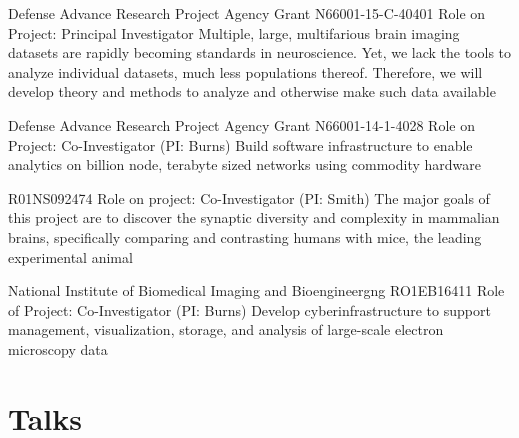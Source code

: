\documentclass[10pt,colorlinks=true,urlcolor=blue]{moderncv}
\begin{document}
{\newline Defense Advance Research Project Agency Grant N66001-15-C-40401
\newline Role on Project: Principal Investigator
\newline Multiple, large, multifarious brain imaging datasets are rapidly becoming standards in
neuroscience. Yet, we lack the tools to analyze individual datasets, much less
populations thereof. Therefore, we will develop theory and methods to analyze and
otherwise make such data available}{}{}{}{}

{\newline Defense Advance Research Project Agency Grant N66001-14-1-4028
\newline Role on Project: Co-Investigator (PI: Burns)
\newline Build software infrastructure to enable analytics on billion node, terabyte sized networks
using commodity hardware}{}{}{}{}

{\newline R01NS092474
\newline Role on project: Co-Investigator (PI: Smith)
\newline The major goals of this project are to discover the synaptic diversity and complexity in
mammalian brains, specifically comparing and contrasting humans with mice, the leading
experimental animal}{}{}{}{}

{\newline National Institute of Biomedical Imaging and Bioengineergng RO1EB16411
\newline Role of Project: Co-Investigator (PI: Burns)
\newline Develop cyberinfrastructure to support management, visualization, storage, and analysis
of large-scale electron microscopy data}{}{}{}{}

\section{Talks}
\begin{refsection}
\nocite{*}
\printbibliography[%
    title=\href{https://neurodata.io/talks/}{Invited Talks (Institutional)},%
    heading=subbibliography%
    ]
\end{refsection}
\end{document}
